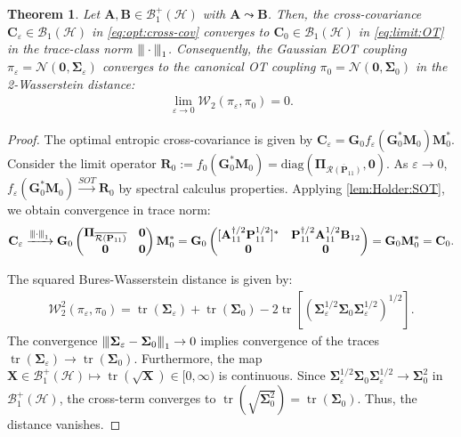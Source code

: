 \documentclass[noinfoline]{imsart}\setcounter{tocdepth}{2}
\newcommand{\m}[1]{\mathbf{#1}}
\renewcommand{\c}[1]{\mathcal{#1}}
\DeclareMathOperator{\tr}{tr}
\newcommand{\vertii}[1]{{\vert\kern-0.25ex\vert\kern-0.25ex\vert #1 
    \vert\kern-0.25ex\vert\kern-0.25ex\vert}} %
\theoremstyle{plain}
\newtheorem{theorem}{Theorem}[section]
\begin{document}
\begin{theorem}\label{thm:EOT:conv}
Let $\m{A}, \m{B} \in \c{B}_{1}^{+}(\c{H})$ with $\m{A} \leadsto \m{B}$. Then, the cross-covariance
$\m{C}_{\varepsilon} \in \c{B}_{1}(\c{H})$ in \eqref{eq:opt:cross-cov} converges to $\m{C}_{0} \in \c{B}_{1}(\c{H})$ in \eqref{eq:limit:OT} in the trace-class norm $\vertii{\cdot}_1$. Consequently, the Gaussian EOT coupling $\pi_{\varepsilon} = \c{N}(\m{0}, \m{\Sigma}_{\varepsilon})$ converges to the canonical OT coupling $\pi_{0} = \c{N}(\m{0}, \m{\Sigma}_{0})$ in the 2-Wasserstein distance:
\begin{align*}
    \lim_{\varepsilon \to 0} \c{W}_{2}(\pi_{\varepsilon}, \pi_{0}) = 0.
\end{align*}
\end{theorem}
\begin{proof}
The optimal entropic cross-covariance is given by $\m{C}_{\varepsilon} = \m{G}_{0} f_{\varepsilon}(\m{G}_{0}^{*} \m{M}_{0}) \m{M}_{0}^*$. 
Consider the limit operator $\m{R}_{0} := f_{0}(\m{G}_{0}^{*} \m{M}_{0}) = \text{diag}(\m{\Pi}_{\overline{\c{R}(\m{P}_{11})}}, \m{0})$. As $\varepsilon \to 0$, $f_{\varepsilon}(\m{G}_{0}^{*} \m{M}_{0}) \xrightarrow{SOT} \m{R}_{0}$ by spectral calculus properties. Applying \cref{lem:Holder:SOT}, we obtain convergence in trace norm:
\begin{align*}
    \m{C}_{\varepsilon} \xrightarrow{\vertii{\cdot}_{1}} \m{G}_{0} \begin{pmatrix} \m{\Pi}_{\overline{\c{R}(\m{P}_{11})}} & \m{0} \\ \m{0} & \m{0} \end{pmatrix} \m{M}_{0}^* = \m{G}_{0} \begin{pmatrix} [\m{A}_{{11}}^{\dagger/2} \m{P}_{11}^{1/2}]^{*} & \m{P}_{11}^{\dagger/2} \m{A}_{{11}}^{1/2} \m{B}_{{12}} \\ \m{0} & \m{0} \end{pmatrix} = \m{G}_{0} \m{M}_{0}^{*} = \m{C}_{0}.
\end{align*}

The squared Bures-Wasserstein distance is given by:
\begin{align*}
    \c{W}_{2}^{2}(\pi_{\varepsilon}, \pi_{0}) = \tr(\m{\Sigma}_{\varepsilon}) + \tr(\m{\Sigma}_{0}) - 2 \tr [(\m{\Sigma}_{\varepsilon}^{1/2} \m{\Sigma}_{0} \m{\Sigma}_{\varepsilon}^{1/2})^{1/2}].
\end{align*}
The convergence $\vertii{\m{\Sigma}_{\varepsilon} - \m{\Sigma}_{0}}_{1} \to 0$ implies convergence of the traces $\tr(\m{\Sigma}_{\varepsilon}) \to \tr(\m{\Sigma}_{0})$. Furthermore, the map $\m{X} \in \c{B}_1^+(\c{H}) \mapsto \tr(\sqrt{\m{X}}) \in [0, \infty)$ is continuous. Since $\m{\Sigma}_{\varepsilon}^{1/2} \m{\Sigma}_{0} \m{\Sigma}_{\varepsilon}^{1/2} \to \m{\Sigma}_{0}^2$ in $\c{B}_{1}^{+}(\c{H})$, the cross-term converges to $\tr(\sqrt{\m{\Sigma}_0^2}) = \tr(\m{\Sigma}_0)$. Thus, the distance vanishes.
\end{proof}
\end{document}
